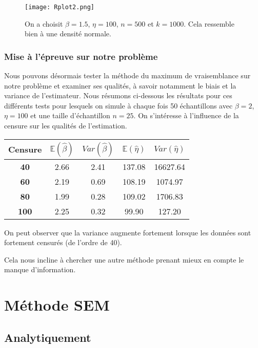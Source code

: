 \documentclass[a4paper]{report}
\begin{document}
\begin{figure}[!ht]
	\centering
     	\texttt{[image: Rplot2.png]}

	\caption{On a choisit $\beta=1.5$, $\eta=100$, $n=500$ et $k=1000$. Cela ressemble bien à une densité normale.}
\end{figure}

\subsection{Mise à l'épreuve sur notre problème}

Nous pouvons désormais tester la méthode du maximum de vraisemblance sur notre problème et examiner ses qualités, à savoir notamment le biais et la variance de l'estimateur. Nous résumons ci-dessous les résultats pour ces différents tests pour lesquels on simule à chaque fois 50 échantillons avec $\beta=2$, $\eta=100$ et une taille d'échantillon $n=25$. On s'intéresse à l'influence de la censure sur les qualités de l'estimation.

\begin{center}
\begin{tabular}{|c||c|c||c|c|}
	\hline
	\bf Censure &  $\mathbb{E}(\hat{\beta})$  &  $Var(\hat{\beta})$ &  $\mathbb{E}(\hat{\eta})$ &  $Var(\hat{\eta})$ \\
	\hline
	\bf 40 &2.66 & 2.41 & 137.08 &16627.64 \\
	\hline
	\bf 60 &2.19 & 0.69 & 108.19 & 1074.97\\
	\hline
	\bf 80 &1.99 & 0.28 &109.02 &1706.83 \\
	\hline
	\bf 100 &2.25 &0.32  & 99.90&  127.20\\
	\hline
\end{tabular}
\end{center}

On peut observer que la variance augmente fortement lorsque les données sont fortement censurés (de l'ordre de 40).

Cela nous incline à chercher une autre méthode prenant mieux en compte le manque d'information. 

  \chapter {Méthode SEM}
  
  \section{Analytiquement}
  
\end{document}
